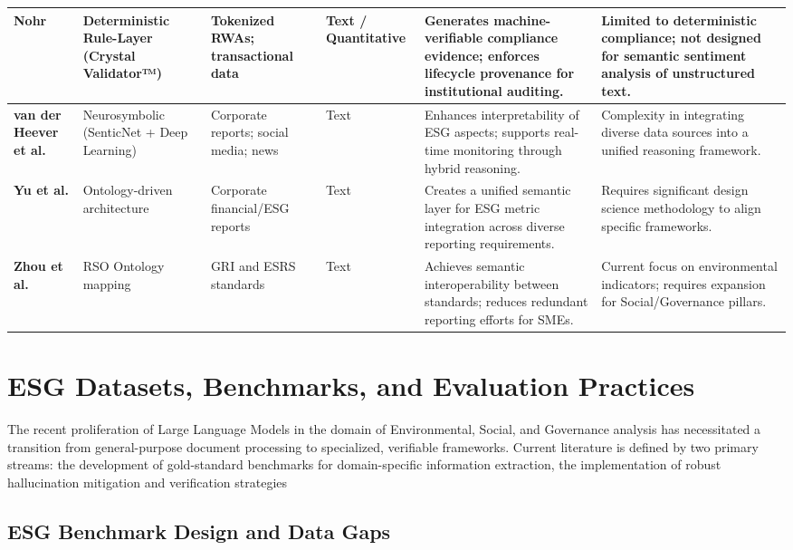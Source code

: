\documentclass[english, online, cse, master]{dithesis}
\begin{document}
\begin{landscape}
\begin{table}[p]
\begin{tabularx}{\linewidth}{|p{1.8cm}|p{3cm}|p{3cm}|p{1.8cm}|X|X|}
\textbf{Nohr } \parencite{steven_paul_nohr_a6874924} & Deterministic Rule-Layer (Crystal Validator™) & Tokenized RWAs; transactional data & Text / Quantitative & Generates machine-verifiable compliance evidence; enforces lifecycle provenance for institutional auditing. & Limited to deterministic compliance; not designed for semantic sentiment analysis of unstructured text. \\ \hline
\textbf{van der Heever et al. } \parencite{wihan_van_der_heever_5ff35709} & Neurosymbolic (SenticNet + Deep Learning) & Corporate reports; social media; news & Text & Enhances interpretability of ESG aspects; supports real-time monitoring through hybrid reasoning. & Complexity in integrating diverse data sources into a unified reasoning framework. \\ \hline
\textbf{Yu et al. } \parencite{mingqin_yu_96a5b8af} & Ontology-driven architecture & Corporate financial/ESG reports & Text & Creates a unified semantic layer for ESG metric integration across diverse reporting requirements. & Requires significant design science methodology to align specific frameworks. \\ \hline
\textbf{Zhou et al. } \parencite{yuchen_zhou_b6beee03} & RSO Ontology mapping & GRI and ESRS standards & Text & Achieves semantic interoperability between standards; reduces redundant reporting efforts for SMEs. & Current focus on environmental indicators; requires expansion for Social/Governance pillars. \\ \hline
\end{tabularx}
\end{table}
\end{landscape}


\section{ESG Datasets, Benchmarks, and Evaluation Practices}

The recent proliferation of Large Language Models in the domain of Environmental, Social, and Governance analysis has necessitated a transition from general-purpose document processing to specialized, verifiable frameworks. Current literature is defined by two primary streams: the development of gold-standard benchmarks for domain-specific information extraction, the implementation of robust hallucination mitigation and verification strategies
\subsection{ESG Benchmark Design and Data Gaps}
\end{document}
